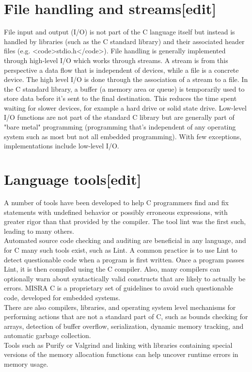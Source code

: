 \documentclass{article}\usepackage{titlesec}
\begin{document}
\section{File handling and streams[edit]}
File input and output (I/O) is not part of the C language itself but instead is handled by libraries (such as the C standard library) and their associated header files (e.g. <code>stdio.h</code>). File handling is generally implemented through high-level I/O which works through streams. A stream is from this perspective a data flow that is independent of devices, while a file is a concrete device. The high level I/O is done through the association of a stream to a file. In the C standard library, a buffer (a memory area or queue) is temporarily used to store data before it's sent to the final destination. This reduces the time spent waiting for slower devices, for example a hard drive or solid state drive. Low-level I/O functions are not part of the standard C library but are generally part of "bare metal" programming (programming that's independent of any operating system such as most but not all embedded programming). With few exceptions, implementations include low-level I/O.
\\

\section{Language tools[edit]}

A number of tools have been developed to help C programmers find and fix statements with undefined behavior or possibly erroneous expressions, with greater rigor than that provided by the compiler.  The tool lint was the first such, leading to many others.
\\
Automated source code checking and auditing are beneficial in any language, and for C many such tools exist, such as Lint. A common practice is to use Lint to detect questionable code when a program is first written. Once a program passes Lint, it is then compiled using the C compiler. Also, many compilers can optionally warn about syntactically valid constructs that are likely to actually be errors. MISRA C is a proprietary set of guidelines to avoid such questionable code, developed for embedded systems.
\\
There are also compilers, libraries, and operating system level mechanisms for performing actions that are not a standard part of C, such as bounds checking for arrays, detection of buffer overflow, serialization, dynamic memory tracking, and automatic garbage collection.
\\
Tools such as Purify or Valgrind and linking with libraries containing special versions of the memory allocation functions can help uncover runtime errors in memory usage.
\\
\end{document}
